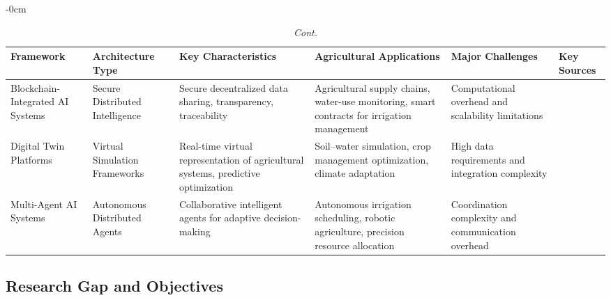 \documentclass[land,review,accept,pdftex,oneauthor]{Definitions/mdpi}
\begin{document}
\begin{table}[H]\ContinuedFloat
\small
\caption{{\em Cont.}}
\renewcommand{\arraystretch}{1.2}

\begin{adjustwidth}{-\extralength}{0cm}
\begin{minipage}{\fulllength}
\begin{tabularx}{\textwidth}{m{2.2cm}<{\raggedright}m{2.8cm}<{\raggedright}m{3.2cm}<{\raggedright}m{3.2cm}<{\raggedright}m{3.2cm}<{\raggedright}m{1.4cm}<{\raggedright}}
\toprule

Framework &
Architecture Type &
Key Characteristics &
Agricultural Applications &
Major Challenges &
Key Sources \\


\midrule

Blockchain-Integrated AI Systems &
Secure Distributed Intelligence &
Secure decentralized data sharing, transparency, traceability &
Agricultural supply chains, water-use monitoring, smart contracts for irrigation management &
Computational overhead and scalability limitations &
\citep{Ferrag2020,nayak2025blockchain,Casino2019,Reyna2018} \\ 
\midrule


Digital Twin Platforms &
Virtual Simulation Frameworks &
Real-time virtual representation of agricultural systems, predictive optimization &
Soil--water simulation, crop management optimization, climate adaptation &
High data requirements and integration complexity &
\citep{Pylianidis2021,Verdouw2021,ALVES2023135920} \\
\midrule

Multi-Agent AI Systems &
Autonomous Distributed Agents &
Collaborative intelligent agents for adaptive decision-making &
Autonomous irrigation scheduling, robotic agriculture, precision resource allocation &
Coordination complexity and communication overhead &
\citep{Wooldridge2009,su17125423,Chlingaryan2018} \\


\bottomrule
\end{tabularx}
\end{minipage}
\end{adjustwidth}
\end{table}

\subsection{Research Gap and Objectives}
\end{document}
